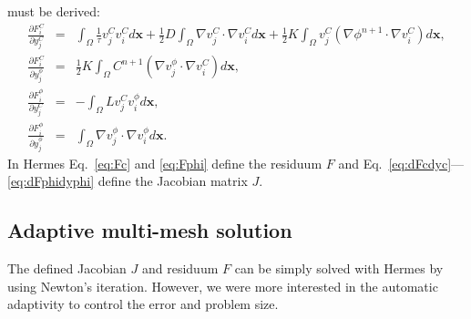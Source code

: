 must be derived: 
\begin{eqnarray}
  \frac{\partial F_i^C}{\partial y_j^C} &=& 
  \int_{\Omega} \frac{1}{\tau} v_j^C v_i^C d\mathbf{x} + 
  \frac 12 D\int_{\Omega} \nabla v_j^C \cdot \nabla v_i^C d\mathbf{x}
  + \frac 12 K\int_{\Omega} v_j^C \left(\nabla \phi^{n+1} \cdot \nabla v_i^C\right) d\mathbf{x},\label{eq:dFcdyc}\\
  \frac{\partial F_i^C}{\partial y_j^{\phi}} &=&
  \frac 12 K \int_{\Omega} C^{n+1} \left(\nabla v_j^{\phi} \cdot \nabla v_i^C\right) d\mathbf{x},\\
  \frac{\partial F_i^{\phi}}{\partial y_j^C} &=&
  - \int_{\Omega} L v_j^C v_i^{\phi} d\mathbf{x},\\
  \frac{\partial F_i^{\phi}}{\partial y_j^{\phi}} &=&
  \int_{\Omega} \nabla v_j^{\phi} \cdot \nabla v_i^{\phi} d\mathbf{x}\label{eq:dFphidyphi}.
\end{eqnarray}
In Hermes Eq.~\eqref{eq:Fc} and \eqref{eq:Fphi} define the residuum $F$ and
Eq.~\eqref{eq:dFcdyc}---\eqref{eq:dFphidyphi} define the Jacobian matrix $J$.

\subsection{Adaptive multi-mesh solution}

The defined Jacobian $J$ and residuum $F$ can be simply solved with Hermes by
using Newton's iteration. However, we were more interested in the automatic
adaptivity to control the error and problem size.

